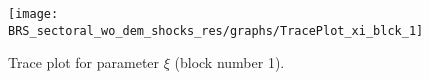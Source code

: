 \begin{figure}[H]
\centering
  \texttt{[image: BRS\_sectoral\_wo\_dem\_shocks\_res/graphs/TracePlot\_xi\_blck\_1]}\\
    \caption{Trace plot for parameter $\xi$ (block number 1).}
\end{figure}
